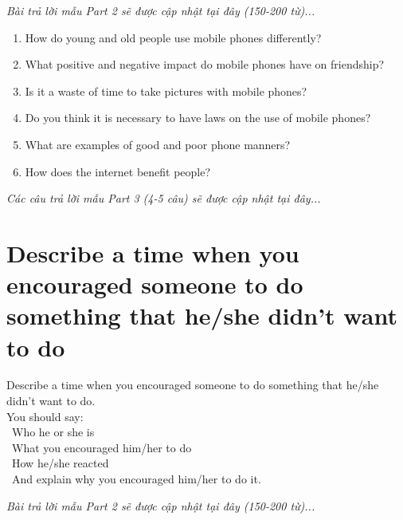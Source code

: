 \vspace{1em}
\textit{Bài trả lời mẫu Part 2 sẽ được cập nhật tại đây (150-200 từ)...}
\vspace{2em}

\begin{ieltsprompt}
\begin{enumerate}[itemsep=4pt]
    \item How do young and old people use mobile phones differently?
    \item What positive and negative impact do mobile phones have on friendship?
    \item Is it a waste of time to take pictures with mobile phones?
    \item Do you think it is necessary to have laws on the use of mobile phones?
    \item What are examples of good and poor phone manners?
    \item How does the internet benefit people?
\end{enumerate}
\end{ieltsprompt}

\vspace{1em}
\textit{Các câu trả lời mẫu Part 3 (4-5 câu) sẽ được cập nhật tại đây...}
\vspace{2em}

\section{Describe a time when you encouraged someone to do something that he/she didn't want to do}
\begin{ieltsprompt}
Describe a time when you encouraged someone to do something that he/she didn't want to do. \\
You should say: \\
\textbullet\ Who he or she is \\
\textbullet\ What you encouraged him/her to do \\
\textbullet\ How he/she reacted \\
\textbullet\ And explain why you encouraged him/her to do it. \\
\end{ieltsprompt}

\vspace{1em}
\textit{Bài trả lời mẫu Part 2 sẽ được cập nhật tại đây (150-200 từ)...}
\vspace{2em}

